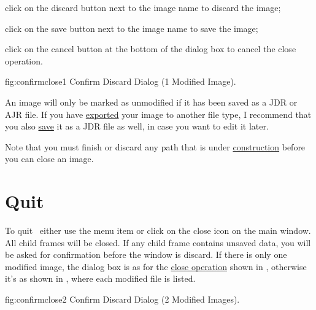 \begin{deflist}

\begin{itemdesc}
click on the discard button next to the image name to discard the
image;
\end{itemdesc}


\begin{itemdesc}
click on the save button next to the image name to save the image;
\end{itemdesc}


\begin{itemdesc}
click on the cancel button at the bottom of the dialog box to cancel
the close operation.
\end{itemdesc}

\end{deflist}

\FloatFig
  {fig:confirmclose1}
  {}
  {Confirm Discard Dialog (1 Modified Image).}

An image will only be marked as unmodified if it has been saved as a
\gls{JDR} or \gls{AJR} file.  If you have
\hyperref[sec:exportimage]{exported} your image to another file
type, I recommend that you also \hyperref[sec:saveimage]{save} it as
a \gls{JDR} file as well, in case you want to edit it later.

Note that you must finish or discard any \gls{path} that is under
\hyperref[sec:newobjects]{construction} before you can close
an image.

\section{Quit}\label{sec:quit}


To quit \FlowframTk\ either use the menu item
 or click on the close icon on the
main window. All child frames will be closed. If any child frame
contains unsaved data, you will be asked for confirmation before
the window is discard. If there is only one modified image, the
dialog box is as for the \hyperref[sec:closeimage]{close operation} shown in
, otherwise it's as shown in
, where each modified file is listed.

\FloatFig
  {fig:confirmclose2}
  {}
  {Confirm Discard Dialog (2 Modified Images).}

